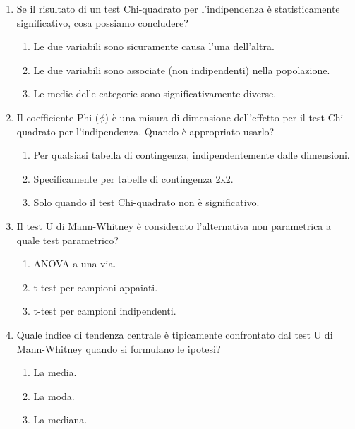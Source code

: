 \documentclass[12pt, a4paper]{article}
\newcommand{\phiCoeff}{\phi} %
\begin{document}
\begin{enumerate}
    \item Se il risultato di un test Chi-quadrato per l'indipendenza è statisticamente significativo, cosa possiamo concludere?
    \begin{enumerate}
        \item Le due variabili sono sicuramente causa l'una dell'altra.
        \item Le due variabili sono associate (non indipendenti) nella popolazione.
        \item Le medie delle categorie sono significativamente diverse.
    \end{enumerate}
    \vspace{0.5cm}

    \item Il coefficiente Phi ($\phiCoeff$) è una misura di dimensione dell'effetto per il test Chi-quadrato per l'indipendenza. Quando è appropriato usarlo?
    \begin{enumerate}
        \item Per qualsiasi tabella di contingenza, indipendentemente dalle dimensioni.
        \item Specificamente per tabelle di contingenza 2x2.
        \item Solo quando il test Chi-quadrato non è significativo.
    \end{enumerate}
    \vspace{0.5cm}

    \item Il test U di Mann-Whitney è considerato l'alternativa non parametrica a quale test parametrico?
    \begin{enumerate}
        \item ANOVA a una via.
        \item t-test per campioni appaiati.
        \item t-test per campioni indipendenti.
    \end{enumerate}
    \vspace{0.5cm}

    \pagebreak %

    \item Quale indice di tendenza centrale è tipicamente confrontato dal test U di Mann-Whitney quando si formulano le ipotesi?
    \begin{enumerate}
        \item La media.
        \item La moda.
        \item La mediana.
    \end{enumerate}
    \vspace{0.5cm}


\end{enumerate}
\end{document}
